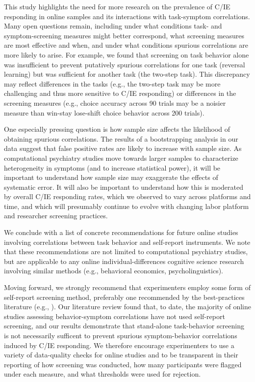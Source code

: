 \documentclass[a4paper,notitlepage,12pt]{article}
\begin{document}
This study highlights the need for more research on the prevalence of C/IE responding in online samples and its interactions with task-symptom correlations. Many open questions remain, including under what conditions task- and symptom-screening measures might better correspond, what screening measures are most effective and when, and under what conditions spurious correlations are more likely to arise. For example, we found that screening on task behavior alone was insufficient to prevent putatively spurious correlations for one task (reversal learning) but was sufficient for another task (the two-step task). This discrepancy may reflect differences in the tasks (e.g., the two-step task may be more challenging and thus more sensitive to C/IE responding) or differences in the screening measures (e.g., choice accuracy across 90 trials may be a noisier measure than win-stay lose-shift choice behavior across 200 trials). 

One especially pressing question is how sample size affects the likelihood of obtaining spurious correlations. The results of a bootstrapping analysis in our data suggest that false positive rates are likely to increase with sample size. As computational psychiatry studies move towards larger samples to characterize heterogeneity in symptoms (and to increase statistical power), it will be important to understand how sample size may exaggerate the effects of systematic error. It will also be important to understand how this is moderated by overall C/IE responding rates, which we observed to vary across platforms and time, and which will presumably continue to evolve with changing labor platform and researcher screening practices.

We conclude with a list of concrete recommendations for future online studies involving correlations between task behavior and self-report instruments. We note that these recommendations are not limited to computational psychiatry studies, but are applicable to any online individual-differences cognitive science research involving similar methods (e.g., behavioral economics, psycholinguistics). 

Moving forward, we strongly recommend that experimenters employ some form of self-report screening method, preferably one recommended by the best-practices literature (e.g., \cite{huang2015insufficient, curran2016methods, thomas2017validity, desimone2018dirty, ophir2020turker}). Our literature review found that, to date, the majority of online studies assessing behavior-symptom correlations have not used self-report screening, and our results demonstrate that stand-alone task-behavior screening is not necessarily sufficent to prevent spurious symptom-behavior correlations induced by C/IE responding. We therefore encourage experimenters to use a variety of data-quality checks for online studies and to be transparent in their reporting of how screening was conducted, how many participants were flagged under each measure, and what thresholds were used for rejection.
\end{document}
